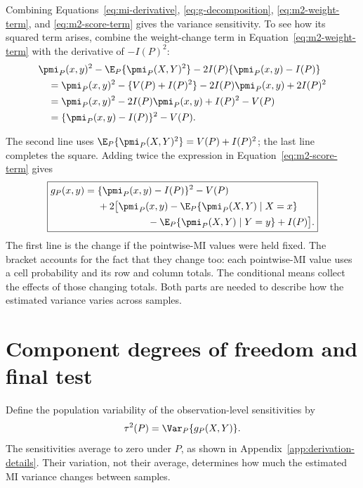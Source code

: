 Combining Equations~\eqref{eq:mi-derivative},
\eqref{eq:g-decomposition}, \eqref{eq:m2-weight-term}, and
\eqref{eq:m2-score-term} gives the variance sensitivity. To see how its
squared term arises, combine the weight-change term in
Equation~\eqref{eq:m2-weight-term} with the derivative of \(-I(P)^2\):
\begin{align*}
 &\pmi_P(x,y)^2-\E_P\{\pmi_P(X,Y)^2\}
       -2I(P)\{\pmi_P(x,y)-I(P)\}\\*
 &\quad=\pmi_P(x,y)^2-\{V(P)+I(P)^2\}
       -2I(P)\pmi_P(x,y)+2I(P)^2\\*
 &\quad=\pmi_P(x,y)^2-2I(P)\pmi_P(x,y)+I(P)^2-V(P)\\*
 &\quad=\{\pmi_P(x,y)-I(P)\}^2-V(P).
\end{align*}
\begin{samepage}%
The second line uses
\(\E_P\{\pmi_P(X,Y)^2\}=V(P)+I(P)^2\); the last line completes the
square. Adding twice the expression in Equation~\eqref{eq:m2-score-term}
gives
\begin{equation}
\boxed{
\begin{aligned}
g_P(x,y)
={}&\{\pmi_P(x,y)-I(P)\}^2-V(P)\\
&+2\bigl[
\pmi_P(x,y)
-\E_P\{\pmi_P(X,Y)\mid X=x\}\\
&\hspace{18mm}
-\E_P\{\pmi_P(X,Y)\mid Y=y\}
+I(P)
\bigr].
\end{aligned}
}
\label{eq:g-final}
\end{equation}
The first line is the change if the pointwise-MI values were held fixed. The
bracket accounts for the fact that they change too: each pointwise-MI value
uses a cell probability and its row and column totals. The conditional means
collect the effects of those changing totals. Both parts are needed to
describe how the estimated variance varies across samples.
\par
\end{samepage}

\section{Component degrees of freedom and final test}


Define the population variability of the observation-level sensitivities by
\begin{equation}
  \tau^2(P)=\Var_P\{g_P(X,Y)\}.
  \label{eq:tau-definition}
\end{equation}
The sensitivities average to zero under \(P\), as shown in
Appendix~\ref{app:derivation-details}. Their variation, not their average,
determines how much the estimated MI variance changes between samples.

